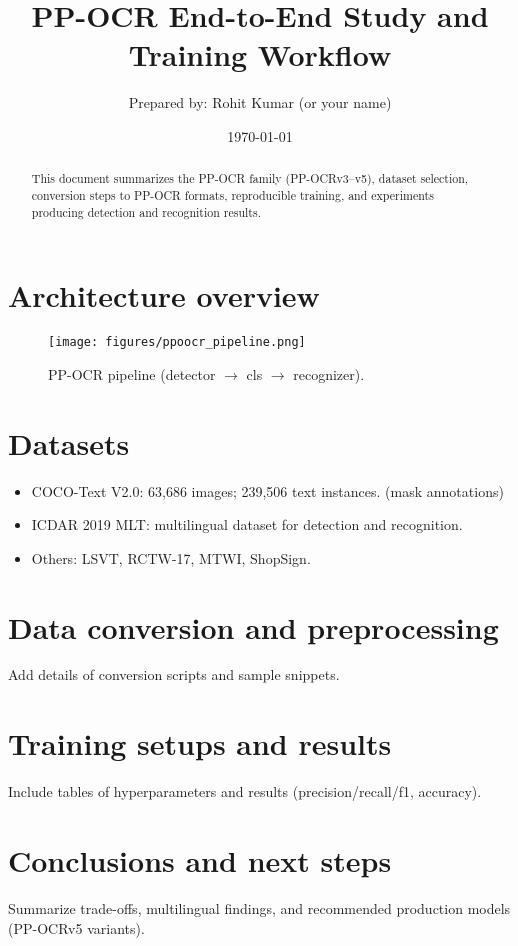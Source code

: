 \documentclass[11pt,a4paper]{article}
\title{PP-OCR End-to-End Study and Training Workflow}
\author{Prepared by: Rohit Kumar (or your name)}
\date{\today}
\begin{document}
\maketitle
\begin{abstract}
This document summarizes the PP-OCR family (PP-OCRv3--v5), dataset selection, conversion steps to PP-OCR formats, reproducible training, and experiments producing detection and recognition results.
\end{abstract}

\section{Architecture overview}
\begin{figure}[H]
\centering
\texttt{[image: figures/ppoocr\_pipeline.png]}
\caption{PP-OCR pipeline (detector $\rightarrow$ cls $\rightarrow$ recognizer).}
\end{figure}

\section{Datasets}
\begin{itemize}
  \item COCO-Text V2.0: 63,686 images; 239,506 text instances. (mask annotations) \cite{cocotext}
  \item ICDAR 2019 MLT: multilingual dataset for detection and recognition. \cite{icdar2019}
  \item Others: LSVT, RCTW-17, MTWI, ShopSign.
\end{itemize}

\section{Data conversion and preprocessing}
Add details of conversion scripts and sample snippets.

\section{Training setups and results}
Include tables of hyperparameters and results (precision/recall/f1, accuracy).

\section{Conclusions and next steps}
Summarize trade-offs, multilingual findings, and recommended production models (PP-OCRv5 variants).



\end{document}
